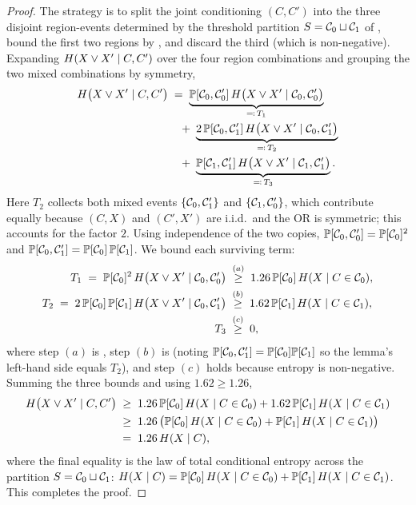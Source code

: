 \begin{proof}
The strategy is to split the joint conditioning $(C, C')$ into the three disjoint
region-events determined by the threshold partition $S = \mathcal{C}_0 \sqcup \mathcal{C}_1$ of
, bound the first two regions by ,
and discard the third (which is non-negative). Expanding
$H(X \vee X' \mid C, C')$ over the four region combinations and grouping
the two mixed combinations by symmetry,
\begin{align}
H\bigl(X \vee X' \mid C, C'\bigr)
&\;=\; \underbrace{\mathbb{P}[\mathcal{C}_0, \mathcal{C}_0']\,H\bigl(X \vee X' \mid \mathcal{C}_0, \mathcal{C}_0'\bigr)}_{\eqqcolon\, T_1} \notag \\
&\quad +\; \underbrace{2\,\mathbb{P}[\mathcal{C}_0, \mathcal{C}_1']\,H\bigl(X \vee X' \mid \mathcal{C}_0, \mathcal{C}_1'\bigr)}_{\eqqcolon\, T_2} \notag \\
&\quad +\; \underbrace{\mathbb{P}[\mathcal{C}_1, \mathcal{C}_1']\,H\bigl(X \vee X' \mid \mathcal{C}_1, \mathcal{C}_1'\bigr)}_{\eqqcolon\, T_3}. \label{eq:three-regions}
\end{align}
Here $T_2$ collects both mixed events $\{\mathcal{C}_0, \mathcal{C}_1'\}$ and $\{\mathcal{C}_1, \mathcal{C}_0'\}$, which
contribute equally because $(C, X)$ and $(C', X')$ are i.i.d.\ and the OR is
symmetric; this accounts for the factor $2$. Using independence of the two copies,
$\mathbb{P}[\mathcal{C}_0, \mathcal{C}_0'] = \mathbb{P}[\mathcal{C}_0]^2$ and $\mathbb{P}[\mathcal{C}_0, \mathcal{C}_1'] = \mathbb{P}[\mathcal{C}_0]\,\mathbb{P}[\mathcal{C}_1]$. We bound
each surviving term:
\begin{align*}
T_1 \;=\; \mathbb{P}[\mathcal{C}_0]^2\,H\bigl(X \vee X' \mid \mathcal{C}_0, \mathcal{C}_0'\bigr)
&\;\overset{(a)}{\ge}\; 1.26\,\mathbb{P}[\mathcal{C}_0]\,H(X \mid C \in \mathcal{C}_0), \\
T_2 \;=\; 2\,\mathbb{P}[\mathcal{C}_0]\,\mathbb{P}[\mathcal{C}_1]\,H\bigl(X \vee X' \mid \mathcal{C}_0, \mathcal{C}_1'\bigr)
&\;\overset{(b)}{\ge}\; 1.62\,\mathbb{P}[\mathcal{C}_1]\,H(X \mid C \in \mathcal{C}_1), \\
T_3 &\;\overset{(c)}{\ge}\; 0,
\end{align*}
where step $(a)$ is , step $(b)$ is 
(noting $\mathbb{P}[\mathcal{C}_0, \mathcal{C}_1'] = \mathbb{P}[\mathcal{C}_0]\mathbb{P}[\mathcal{C}_1]$ so the lemma's left-hand side equals
$T_2$), and step $(c)$ holds because entropy is non-negative. Summing the three
bounds and using $1.62 \ge 1.26$,
\begin{align*}
H\bigl(X \vee X' \mid C, C'\bigr)
&\;\ge\; 1.26\,\mathbb{P}[\mathcal{C}_0]\,H(X \mid C \in \mathcal{C}_0) + 1.62\,\mathbb{P}[\mathcal{C}_1]\,H(X \mid C \in \mathcal{C}_1) \\
&\;\ge\; 1.26\,\bigl(\mathbb{P}[\mathcal{C}_0]\,H(X \mid C \in \mathcal{C}_0) + \mathbb{P}[\mathcal{C}_1]\,H(X \mid C \in \mathcal{C}_1)\bigr) \\
&\;=\; 1.26\,H(X \mid C),
\end{align*}
where the final equality is the law of total conditional entropy across the
partition $S = \mathcal{C}_0 \sqcup \mathcal{C}_1$:
$H(X \mid C) = \mathbb{P}[\mathcal{C}_0]\,H(X \mid C \in \mathcal{C}_0) + \mathbb{P}[\mathcal{C}_1]\,H(X \mid C \in \mathcal{C}_1)$.
This completes the proof.
\end{proof}

